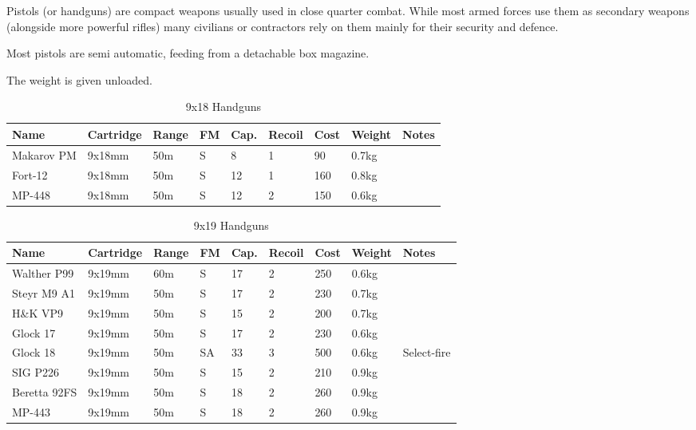 Pistols (or handguns) are compact weapons usually used in close quarter combat.
While most armed forces use them as secondary weapons (alongside more powerful
rifles) many civilians or contractors rely on them mainly for their security
and defence.

Most pistols are semi automatic, feeding from a detachable box magazine.

The weight is given unloaded.

\begin{table}
  \caption{9x18 Handguns}
  \label{tab:Handguns918}
  \begin{center}
    \begin{tabular}{| l | l | l | l | l | l | l | l | l |}
      \hline
      \textbf{Name} & \textbf{Cartridge} & \textbf{Range} &
      \textbf{FM} & \textbf{Cap.} & \textbf{Recoil} &
      \textbf{Cost} & \textbf{Weight} & \textbf{Notes} \\ \hline

      Makarov PM & 9x18mm & 50m & S & 8  & 1 & 90  & 0.7kg & \\ \hline
      Fort-12    & 9x18mm & 50m & S & 12 & 1 & 160 & 0.8kg & \\ \hline
      MP-448     & 9x18mm & 50m & S & 12 & 2 & 150 & 0.6kg & \\ \hline

    \end{tabular}
  \end{center}
\end{table}

\begin{table}
  \caption{9x19 Handguns}
  \label{tab:Handguns919}
  \begin{center}
    \begin{tabular}{| l | l | l | l | l | l | l | l | l |}
      \hline
      \textbf{Name} & \textbf{Cartridge} & \textbf{Range} &
      \textbf{FM} & \textbf{Cap.} & \textbf{Recoil} &
      \textbf{Cost} & \textbf{Weight} & \textbf{Notes} \\ \hline

      Walther P99  & 9x19mm & 60m & S  & 17 & 2 & 250 & 0.6kg & \\ \hline
      Steyr M9 A1  & 9x19mm & 50m & S  & 17 & 2 & 230 & 0.7kg & \\ \hline
      H\&K VP9     & 9x19mm & 50m & S  & 15 & 2 & 200 & 0.7kg & \\ \hline
      Glock 17     & 9x19mm & 50m & S  & 17 & 2 & 230 & 0.6kg & \\ \hline
      Glock 18     & 9x19mm & 50m & SA & 33 & 3 & 500 & 0.6kg & Select-fire \\ \hline
      SIG P226     & 9x19mm & 50m & S  & 15 & 2 & 210 & 0.9kg & \\ \hline
      Beretta 92FS & 9x19mm & 50m & S  & 18 & 2 & 260 & 0.9kg & \\ \hline
      MP-443       & 9x19mm & 50m & S  & 18 & 2 & 260 & 0.9kg & \\ \hline

    \end{tabular}
  \end{center}
\end{table}

